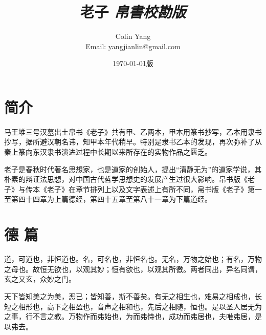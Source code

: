 \documentclass[a5paper,zihao=-4,oneside,UTF8]{ctexart}
\title{\textbf{老子}\textit{ \hspace{5em}帛書校勘版}\hfil}
\author{Colin Yang \\Email: yangjianlin@gmail.com}
\date{\normalsize\today 版}
\begin{document}
\large

\maketitle

\section*{简介}

马王堆三号汉墓出土帛书《老子》共有甲、乙两本，甲本用篆书抄写，乙本用隶书抄写，据所避汉朝名讳，知甲本年代稍早。特别是隶书乙本的发现，再次弥补了从秦上篆向东汉隶书演进过程中长期以来所存在的实物作品之匮乏。

老子是春秋时代著名思想家，也是道家的创始人，提出“清静无为”的道家学说，其朴素的辩证法思想，对中国古代哲学思想史的发展产生过很大影响。帛书版《老子》与传本《老子》在章节排列上以及文字表述上有所不同，帛书版《老子》第一至第四十四章为上篇德经，第四十五章至第八十一章为下篇道经。

\newpage

\section{德 篇}
道，可道也，非恒道也。名，可名也，非恒名也。无名，万物之始也；有名，万物之母也。故恒无欲也，以观其妙；恒有欲也，以观其所徼。两者同出，异名同谓，玄之又玄，众妙之门。

天下皆知美之为美，恶已；皆知善，斯不善矣。有无之相生也，难易之相成也，长短之相形也，高下之相盈也，音声之相和也，先后之相随，恒也。是以圣人居无为之事，行不言之教。万物作而弗始也，为而弗恃也，成功而弗居也，夫唯弗居，是以弗去。
\end{document}
